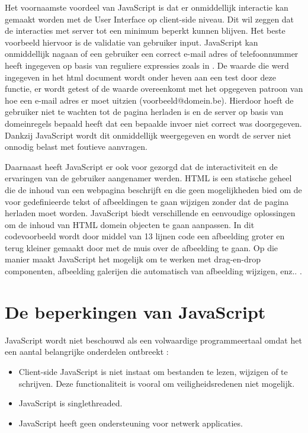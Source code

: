 	Het voornaamste voordeel van JavaScript is dat er onmiddellijk interactie kan gemaakt worden met de User Interface op client-side niveau. Dit wil zeggen dat de interacties met server tot een minimum beperkt kunnen blijven. Het beste voorbeeld hiervoor is de validatie van gebruiker input. JavaScript kan onmiddellijk nagaan of een gebruiker een correct e-mail adres of telefoonnummer heeft ingegeven op basis van reguliere expressies zoals in . De waarde die werd ingegeven in het html document wordt onder heven aan een test door deze functie, er wordt getest of de waarde overeenkomt met het opgegeven patroon van hoe een e-mail adres er moet uitzien (voorbeeld@domein.be). Hierdoor hoeft de gebruiker niet te wachten tot de pagina herladen is en de server op basis van domeinregels bepaald heeft dat een bepaalde invoer niet correct was doorgegeven. Dankzij JavaScript wordt dit onmiddellijk weergegeven en wordt de server niet onnodig belast met foutieve aanvragen.

	Daarnaast heeft JavaScript er ook voor gezorgd dat de interactiviteit en de ervaringen van de gebruiker aangenamer werden. HTML is een statische geheel die de inhoud van een webpagina beschrijft en die geen mogelijkheden bied om de voor gedefinieerde tekst of afbeeldingen te gaan wijzigen zonder dat de pagina herladen moet worden. JavaScript biedt verschillende en eenvoudige oplossingen om de inhoud van HTML domein objecten te gaan aanpassen. 
	In dit codevoorbeeld  wordt door middel van 13 lijnen code een afbeelding groter en terug kleiner gemaakt door met de muis over de afbeelding te gaan. Op die manier maakt JavaScript het mogelijk om te werken met drag-en-drop componenten, afbeelding galerijen die automatisch van afbeelding wijzigen, enz.. .

\section{De beperkingen van JavaScript}
JavaScript wordt niet beschouwd als een volwaardige programmeertaal omdat het een aantal belangrijke onderdelen ontbreekt : 
	\begin{itemize}
		\item Client-side JavaScript is niet instaat om bestanden te lezen, wijzigen of te schrijven. Deze functionaliteit is vooral om veiligheidsredenen niet mogelijk.
		\item JavaScript is singlethreaded.
		\item JavaScript heeft geen ondersteuning voor netwerk applicaties.
	\end{itemize} 
